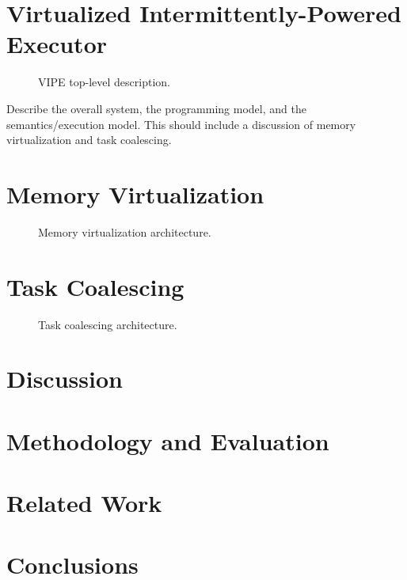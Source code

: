 \documentclass[sigconf,anonymous,review]{acmart}
\newcommand{\sys}{VIPE\xspace}
\newcommand{\sysfull}{Virtualized Intermittently-Powered Executor\xspace}
\begin{document}


\section{\sysfull}
\label{sec:overeall_system}

\begin{figure}
	\centering
	\caption{\sys top-level description.}
	\label{fig:}
\end{figure}

Describe the overall system, the programming model, and the semantics/execution model. This should include a discussion of memory virtualization and task coalescing.

\section{Memory Virtualization}
\label{sec:memory_virtulaization}

\begin{figure}
	\centering
	\caption{Memory virtualization architecture.}
	\label{fig:}
\end{figure}

\section{Task Coalescing}
\label{sec:memory_virtulaization}

\begin{figure}
	\centering
	\caption{Task coalescing architecture.}
	\label{fig:}
\end{figure}

\section{Discussion}
\label{sec:discussion}

\section{Methodology and Evaluation}
\label{sec:methodology_evaluation}

\section{Related Work}
\label{sec:related_work}

\section{Conclusions}
\label{sec:conclusions}
\end{document}
